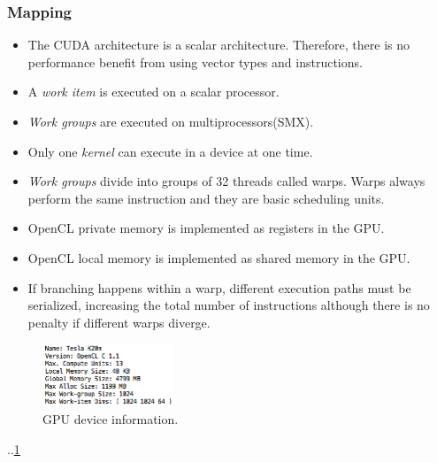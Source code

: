 \subsubsection{Mapping}
\begin{itemize}
    \item The CUDA architecture is a scalar architecture. Therefore, there is no performance benefit from using vector types and 
        instructions\cite{gpu_opencl_cuda}.
    \item A \emph{work item} is executed on a scalar processor\cite{gpu_opencl_opt_slides}.
    \item \emph{Work groups} are executed on multiprocessors(SMX)\cite{gpu_opencl_opt_slides}.
    \item Only one \emph{kernel} can execute in a device at one time\cite{gpu_opencl_opt_slides}.
    \item \emph{Work groups} divide into groups of 32 threads called warps. Warps always perform the same instruction and they
        are basic scheduling units\cite{gpu_opencl_opt_slides}.
    \item OpenCL private memory is implemented as registers in the GPU\cite{gpu_opencl_opt_slides}.
    \item OpenCL local memory is implemented as shared memory in the GPU\cite{gpu_opencl_opt_slides}.
    \item If branching happens within a warp, different execution paths must be serialized, increasing the total number of 
        instructions although there is no penalty if different warps diverge\cite{gpu_opencl_opt_slides}.
\end{itemize}

\begin{figure}[!h]
    \centering
    \includegraphics[width=0.35\textwidth]{figures/gpu_device_info.png}
    \caption{GPU device information.}
    \label{GpuDeviceInfo}
\end{figure}

\par{..\cite{gpu_specs1}\ref{GpuDeviceInfo}\cite{gpu_opencl_cuda}}




